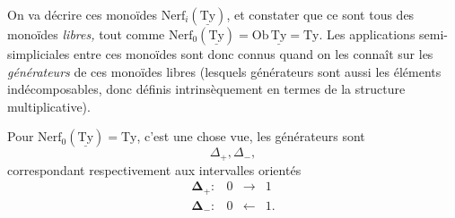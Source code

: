\documentclass[11pt]{article}
\newcommand{\printedpage}[1]{\marginpar{\footnotesize p.~#1}}
\newcommand{\uTy}{\underline{\mathrm{Ty}}}
\begin{document}
\printedpage{34}
On va décrire ces monoïdes $\mathrm{Nerf}_i(\uTy)$, et constater que ce sont tous des monoïdes \textit{libres,} tout comme $\mathrm{Nerf}_0(\uTy) = \mathrm{Ob}\,\uTy = \mathrm{Ty}$. Les applications semi-simpliciales entre ces monoïdes sont donc connus quand on les connaît sur les \textit{générateurs} de ces monoïdes libres (lesquels générateurs sont aussi les éléments indécomposables, donc définis intrinsèquement en termes de la structure multiplicative). %

Pour $\mathrm{Nerf}_0(\uTy) = \mathrm{Ty}$, c'est une chose vue, les générateurs sont
\[
\Delta_+,\Delta_-,
\]
correspondant respectivement aux intervalles orientés
\[
\begin{array}{rccc}
\boldsymbol{\Delta}_+ : & 0 & \longrightarrow & 1\\[4pt]
\boldsymbol{\Delta}_- : & 0 & \longleftarrow & 1.
\end{array}
\]
\end{document}

